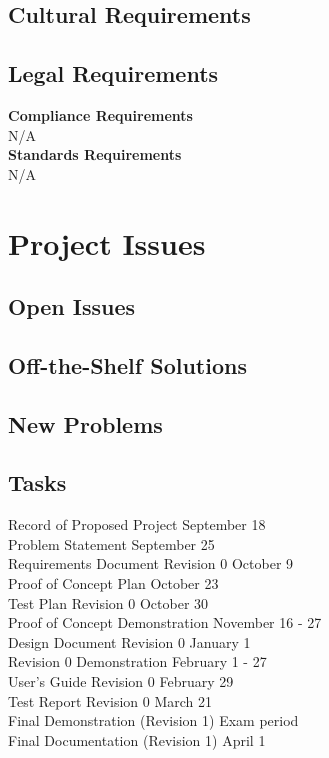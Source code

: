 \documentclass[12pt]{article}
\begin{document}
\subsection{Cultural Requirements} %
\subsection{Legal Requirements} %
\textbf{Compliance Requirements}\\
N/A\\
\textbf{Standards Requirements}\\
N/A\\
\section{Project Issues}
\subsection{Open Issues} %
\subsection{Off-the-Shelf Solutions} %
\subsection{New Problems} %
\subsection{Tasks} %

Record of Proposed Project 		\hfill 	September 18\\
Problem Statement			 	\hfill	September 25\\
Requirements Document Revision 0	\hfill	October 9\\
Proof of Concept Plan			\hfill	October 23\\
Test Plan Revision 0				\hfill	October 30\\
Proof of Concept Demonstration		\hfill	November 16 - 27\\
Design Document Revision 0		\hfill	January 1\\
Revision 0 Demonstration 			\hfill	February 1 -  27\\
User's Guide Revision 0			\hfill	February 29\\
Test Report Revision 0			\hfill	March 21\\
Final Demonstration (Revision 1)		\hfill	Exam period\\
Final Documentation (Revision 1)		\hfill	April 1
\end{document}
